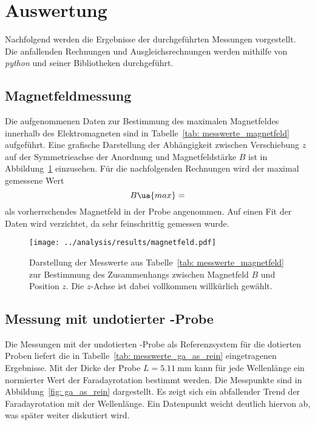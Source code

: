 \newpage
\section{Auswertung}
Nachfolgend werden die Ergebnisse der durchgeführten Messungen vorgestellt. Die anfallenden 
Rechnungen und Ausgleichsrechnungen werden mithilfe von \emph{python} und seiner Bibliotheken durchgeführt.
\subsection{Magnetfeldmessung}
Die aufgenommenen Daten zur Bestimmung des maximalen Magnetfeldes innerhalb des Elektromagneten 
sind in Tabelle~\ref{tab: messwerte_magnetfeld} aufgeführt. Eine grafische Darstellung der Abhängigkeit zwischen Verschiebung 
$z$ auf der Symmetrieachse der Anordnung und Magnetfeldstärke $B$ ist in Abbildung~\ref{fig: magnetfeld} einzusehen. 
Für die nachfolgenden Rechnungen wird der maximal gemessene Wert 
\begin{equation}
    B\ua{max} = 
\end{equation}
als vorherrschendes Magnetfeld in der Probe angenommen. Auf einen Fit der Daten wird verzichtet, 
da sehr feinschrittig gemessen wurde.

\begin{figure}
\centering
\texttt{[image: ../analysis/results/magnetfeld.pdf]}
\caption{Darstellung der Messwerte aus Tabelle~\ref{tab: messwerte_magnetfeld} zur Bestimmung des Zusammenhangs zwischen 
Magnetfeld $B$ und Position $z$. Die $z$-Achse ist dabei vollkommen willkürlich gewählt.}
\label{fig: magnetfeld}
\end{figure}






\subsection{Messung mit undotierter -Probe}
Die Messungen mit der undotierten -Probe als Referenzsystem für die dotierten Proben liefert die 
in Tabelle~\ref{tab: messwerte_ga_as_rein} eingetragenen Ergebnisse. Mit der Dicke der Probe $L = \SI{5.11}{\milli\meter}$ kann für jede 
Wellenlänge ein normierter Wert der Faradayrotation bestimmt werden. Die Messpunkte sind in Abbildung~\ref{fig: ga_as_rein}
dargestellt. Es zeigt sich ein abfallender Trend der Faradayrotation mit der Wellenlänge. Ein Datenpunkt weicht deutlich 
hiervon ab, was später weiter diskutiert wird.  


